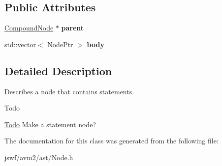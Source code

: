 \subsection*{Public Attributes}
\begin{DoxyCompactItemize}
\item 
\hypertarget{classjswf_1_1avm2_1_1ast_1_1_compound_node_a9ebf4cd8a31976e96fa1ce86402b1c4c}{\hyperlink{classjswf_1_1avm2_1_1ast_1_1_compound_node}{Compound\+Node} $\ast$ {\bfseries parent}}\label{classjswf_1_1avm2_1_1ast_1_1_compound_node_a9ebf4cd8a31976e96fa1ce86402b1c4c}

\item 
\hypertarget{classjswf_1_1avm2_1_1ast_1_1_compound_node_a6bd75515f8858dec99745eab8b5903b1}{std\+::vector$<$ Node\+Ptr $>$ {\bfseries body}}\label{classjswf_1_1avm2_1_1ast_1_1_compound_node_a6bd75515f8858dec99745eab8b5903b1}

\end{DoxyCompactItemize}


\subsection{Detailed Description}
Describes a node that contains statements. 

\begin{DoxyRefDesc}{Todo}
\item[\hyperlink{todo__todo000005}{Todo}]Make a statement node? \end{DoxyRefDesc}


The documentation for this class was generated from the following file\+:\begin{DoxyCompactItemize}
\item 
jswf/avm2/ast/Node.\+h\end{DoxyCompactItemize}
